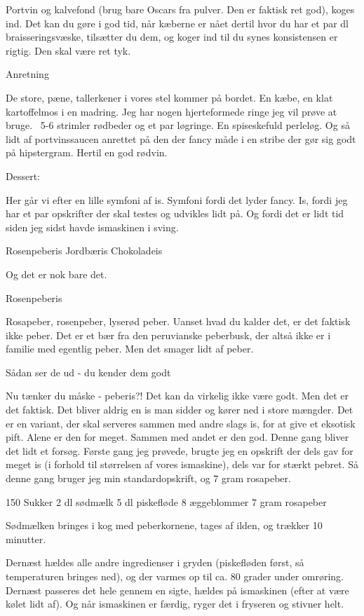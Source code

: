\documentclass[
  letterpaper,
  DIV=11,
  numbers=noendperiod]{scrreprt}
\begin{document}
Portvin og kalvefond (brug bare Oscars fra pulver. Den er faktisk ret
god), koges ind. Det kan du gøre i god tid, når kæberne er nået dertil
hvor du har et par dl braisseringsvæske, tilsætter du dem, og koger ind
til du synes konsistensen er rigtig. Den skal være ret tyk.

Anretning

De store, pæne, tallerkener i vores stel kommer på bordet. En kæbe, en
klat kartoffelmos i en madring. Jeg har nogen hjerteformede ringe jeg
vil prøve at bruge.~ 5-6 strimler rødbeder og et par løgringe. En
spiseskefuld perleløg. Og så lidt af portvinssaucen anrettet på den der
fancy måde i en stribe der gør sig godt på hipstergram. Hertil en god
rødvin.

Dessert:

Her går vi efter en lille symfoni af is. Symfoni fordi det lyder fancy.
Is, fordi jeg har et par opskrifter der skal testes og udvikles lidt på.
Og fordi det er lidt tid siden jeg sidst havde ismaskinen i sving.

Rosenpeberis Jordbæris Chokoladeis

Og det er nok bare det.

Rosenpeberis

Rosapeber, rosenpeber, lyserød peber. Uanset hvad du kalder det, er det
faktisk ikke peber. Det er et bær fra den peruvianske peberbusk, der
altså ikke er i familie med egentlig peber. Men det smager lidt af
peber.

Sådan ser de ud - du kender dem godt

Nu tænker du måske - peberis?! Det kan da virkelig ikke være godt. Men
det er det faktisk. Det bliver aldrig en is man sidder og kører ned i
store mængder. Det er en variant, der skal serveres sammen med andre
slags is, for at give et eksotisk pift. Alene er den for meget. Sammen
med andet er den god. Denne gang bliver det lidt et forsøg. Første gang
jeg prøvede, brugte jeg en opskrift der dels gav for meget is (i forhold
til størrelsen af vores ismaskine), dels var for stærkt pebret. Så denne
gang bruger jeg min standardopskrift, og 7 gram rosapeber.

150 Sukker 2 dl sødmælk 5 dl piskefløde 8 æggeblommer 7 gram rosapeber

Sødmælken bringes i kog med peberkornene, tages af ilden, og trækker 10
minutter.

Dernæst hældes alle andre ingredienser i gryden (piskefløden først, så
temperaturen bringes ned), og der varmes op til ca. 80 grader under
omrøring. Dernæst passeres det hele gennem en sigte, hældes på
ismaskinen (efter at være kølet lidt af). Og når ismaskinen er færdig,
ryger det i fryseren og stivner helt.
\end{document}

